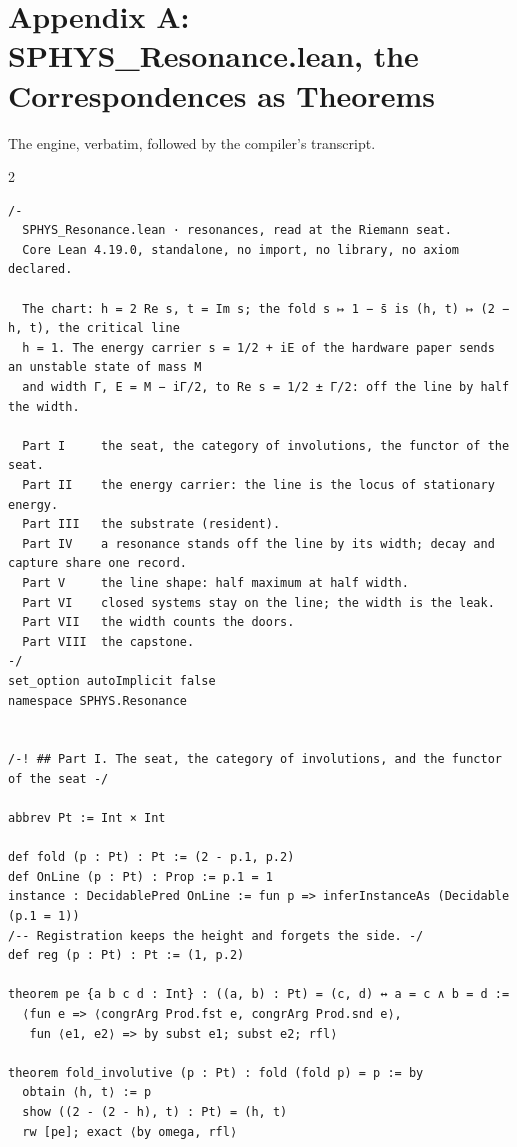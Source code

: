 \documentclass[10pt]{article}
\begin{document}
\hypertarget{appendix-a-sphys_resonance.lean-the-correspondences-as-theorems}{%
\section{Appendix A: SPHYS\_Resonance.lean, the Correspondences as
Theorems}\label{appendix-a-sphys_resonance.lean-the-correspondences-as-theorems}}

The engine, verbatim, followed by the compiler's transcript.

\begin{multicols}{2}
\begin{Verbatim}[fontsize=\fontsize{5.9}{6.8}\selectfont,breaklines,breakanywhere,breaksymbolleft={}]
/-
  SPHYS_Resonance.lean · resonances, read at the Riemann seat.
  Core Lean 4.19.0, standalone, no import, no library, no axiom declared.

  The chart: h = 2 Re s, t = Im s; the fold s ↦ 1 − s̄ is (h, t) ↦ (2 − h, t), the critical line
  h = 1. The energy carrier s = 1/2 + iE of the hardware paper sends an unstable state of mass M
  and width Γ, E = M − iΓ/2, to Re s = 1/2 ± Γ/2: off the line by half the width.

  Part I     the seat, the category of involutions, the functor of the seat.
  Part II    the energy carrier: the line is the locus of stationary energy.
  Part III   the substrate (resident).
  Part IV    a resonance stands off the line by its width; decay and capture share one record.
  Part V     the line shape: half maximum at half width.
  Part VI    closed systems stay on the line; the width is the leak.
  Part VII   the width counts the doors.
  Part VIII  the capstone.
-/
set_option autoImplicit false
namespace SPHYS.Resonance


/-! ## Part I. The seat, the category of involutions, and the functor of the seat -/

abbrev Pt := Int × Int

def fold (p : Pt) : Pt := (2 - p.1, p.2)
def OnLine (p : Pt) : Prop := p.1 = 1
instance : DecidablePred OnLine := fun p => inferInstanceAs (Decidable (p.1 = 1))
/-- Registration keeps the height and forgets the side. -/
def reg (p : Pt) : Pt := (1, p.2)

theorem pe {a b c d : Int} : ((a, b) : Pt) = (c, d) ↔ a = c ∧ b = d :=
  ⟨fun e => ⟨congrArg Prod.fst e, congrArg Prod.snd e⟩,
   fun ⟨e1, e2⟩ => by subst e1; subst e2; rfl⟩

theorem fold_involutive (p : Pt) : fold (fold p) = p := by
  obtain ⟨h, t⟩ := p
  show ((2 - (2 - h), t) : Pt) = (h, t)
  rw [pe]; exact ⟨by omega, rfl⟩


\end{Verbatim}
\end{multicols}
\end{document}
